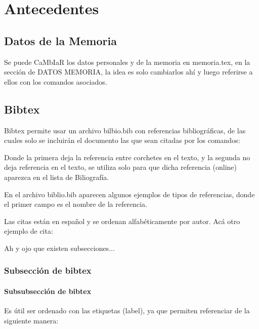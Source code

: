 
\chapter{Antecedentes}\label{cap:antecedentes}

\section{Datos de la Memoria}\label{cap:antecedentes:datos}
Se puede CaMbIaR los datos personales y de la memoria en memoria.tex, en la sección de DATOS MEMORIA, la idea es solo cambiarlos ahí y luego referirse a ellos con los comandos asociados.

\section{Bibtex}\label{cap:antecedentes:bibtex}
Bibtex permite usar un archivo bilbio.bib con referencias bibliográficas, de las cuales solo se incluirán el documento las que sean citadas por los comandos:

\cite{Bdo}
\nocite{reactionCommerce}

Donde la primera deja la referencia entre corchetes en el texto, y la segunda no deja referencia en el texto, se utiliza solo para que dicha referencia (online) aparezca en el lista de Biliografía.

En el archivo biblio.bib aparecen algunos ejemplos de tipos de referencias, donde el primer campo es el nombre de la referencia.

Las citas están en español y se ordenan alfabéticamente por autor. Acá otro ejemplo de cita: \cite{Palma}

Ah y ojo que existen subsecciones...

\subsection{Subsección de bibtex}\label{cap:antecedentes:bibtex:subseccion}

\subsubsection{Subsubsección de bibtex}\label{cap:antecedentes:bibtex:subseccion:subsubsection}

Es útil ser ordenado con las etiquetas (label), ya que permiten referenciar de la siguiente manera:

